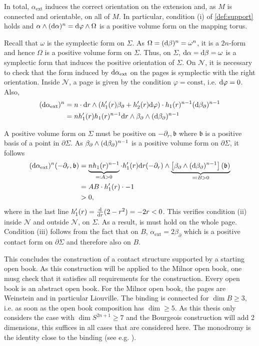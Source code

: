 In total, $\alpha_\text{ext}$ induces the correct orientation on the extension and,
as $M$ is connected and orientable, on all of $M$.
In particular, condition (i) of \cref{def:support} holds and $\alpha \wedge (\mathrm{d} \alpha)^n = \mathrm{d} \varphi \wedge \Omega$ is a positive volume form on the mapping torus. 

Recall that $\omega$ is the symplectic form on $\Sigma$.
As $\Omega = (\mathrm{d} \beta)^n = \omega^n$, it is a $2n$-form and hence $\Omega$ is a positive volume form on $\Sigma$. 
Thus, on $\Sigma$, $\mathrm{d} \alpha = \mathrm{d} \beta = \omega$ is a symplectic form that induces the positive orientation of $\Sigma$. 
On $\mathcal{N}$, it is necessary to check that the form induced by $\mathrm{d} \alpha_\text{ext}$ on the pages is symplectic with the right orientation.
Inside $\mathcal{N}$, a page is given by the condition $\varphi = \mathrm{const}$, i.e. $\mathrm{d} \varphi = 0$.
Also,
\begin{align*}
    (\mathrm{d} \alpha_\text{ext})^n &= n\cdot \mathrm{d} r\wedge (h_1'(r) \beta_\partial + h_2'(r) \mathrm{d}\varphi) \cdot h_1(r)^{n-1}(\mathrm{d} \beta_\partial)^{n-1}\\
    &= n h_1'(r)h_1(r)^{n-1} \mathrm{d} r \wedge \beta_\partial \wedge (\mathrm{d} \beta_\partial)^{n-1}
\end{align*}

A positive volume form on $\Sigma$ must be positive on $- \partial_r, \mathfrak{b}$ where $\mathfrak{b}$ is a positive basis of a point in $\partial \Sigma$.
As $\beta_\partial \wedge (\mathrm{d} \beta_\partial)^{n-1}$ is a positive volume form on $\partial \Sigma$, it follows
\begin{align*}
    (\mathrm{d} \alpha_\text{ext})^n(- \partial_r, \mathfrak{b}) &= \underbrace{n h_1(r)^{n-1}}_{\eqqcolon A > 0} \cdot h_1'(r) \mathrm{d} r(-\partial_r) \wedge \underbrace{\left[\beta_\partial \wedge (\mathrm{d} \beta_\partial)^{n-1}\right](\mathfrak{b})}_{\eqqcolon B > 0}\\
    &= AB \cdot h_1'(r) \cdot -1\\
    &> 0,
\end{align*}
where in the last line $h_1'(r) = \frac{\mathrm{d}}{\mathrm{d} r}(2 - r^2) = -2r < 0$.
This verifies condition (ii) inside $\mathcal{N}$ and outside $\mathcal{N}$, on $\Sigma$. As a result, is must hold on the whole page.
Condition (iii) follows from the fact that on $B$, $\alpha_\text{ext} = 2 \beta_\partial$ which is a positive contact form on $\partial \Sigma$ and therefore also on $B$.

This concludes the construction of a contact structure supported by a starting open book.
As this construction will be applied to the Milnor open book, one musg check that it satisfies all requirements for the construction.
Every open book is an abstract open book. For the Milnor open book, the pages are Weinstein and in particular Liouville.
The binding is connected for $\dim B \geq 3$, i.e. as soon as the open book composition has $\dim \geq 5$.
As this thesis only considers the case with $\dim S^{2n+1} \geq 7$ and the Bourgeois construction will add 2 dimensions, this suffices
in all cases that are considered here. 
The monodromy is the identity close to the binding (see e.g. \cite[section 4.2]{KvK16}).